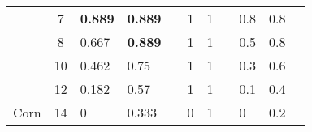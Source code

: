 \begin{table}[]
\begin{tabular}{|c|c|l|l|l|l|l|l|l|l|l|}
                        & 7                     & \cellcolor[HTML]{EFEFEF}\textbf{0.889} & \cellcolor[HTML]{EFEFEF}\textbf{0.889} & \cellcolor[HTML]{EFEFEF}               & 1        & 1        &          & \cellcolor[HTML]{EFEFEF}0.8   & \cellcolor[HTML]{EFEFEF}0.8   & \cellcolor[HTML]{EFEFEF}      \\ \cline{2-11} 
                        & 8                     & \cellcolor[HTML]{EFEFEF}0.667          & \cellcolor[HTML]{EFEFEF}\textbf{0.889} & \cellcolor[HTML]{EFEFEF}               & 1        & 1        &          & \cellcolor[HTML]{EFEFEF}0.5   & \cellcolor[HTML]{EFEFEF}0.8   & \cellcolor[HTML]{EFEFEF}      \\ \cline{2-11} 
                        & 10                    & \cellcolor[HTML]{EFEFEF}0.462          & \cellcolor[HTML]{EFEFEF}0.75           & \cellcolor[HTML]{EFEFEF}               & 1        & 1        &          & \cellcolor[HTML]{EFEFEF}0.3   & \cellcolor[HTML]{EFEFEF}0.6   & \cellcolor[HTML]{EFEFEF}      \\ \cline{2-11} 
                        & 12                    & \cellcolor[HTML]{EFEFEF}0.182          & \cellcolor[HTML]{EFEFEF}0.57           & \cellcolor[HTML]{EFEFEF}               & 1        & 1        &          & \cellcolor[HTML]{EFEFEF}0.1   & \cellcolor[HTML]{EFEFEF}0.4   & \cellcolor[HTML]{EFEFEF}      \\ \cline{2-11} 
\multirow{-9}{*}{Corn}  & 14                    & \cellcolor[HTML]{EFEFEF}0              & \cellcolor[HTML]{EFEFEF}0.333          & \cellcolor[HTML]{EFEFEF}               & 0        & 1        &          & \cellcolor[HTML]{EFEFEF}0     & \cellcolor[HTML]{EFEFEF}0.2   & \cellcolor[HTML]{EFEFEF}      \\ \hline
\end{tabular}
\end{table}
